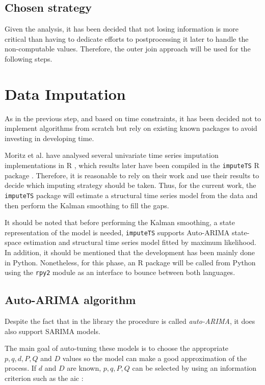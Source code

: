\subsection{Chosen strategy}

Given the analysis, it has been decided that not losing information is more critical than having to dedicate efforts to postprocessing it later to handle the non-computable values. Therefore, the outer join approach will be used for the following steps.

\section{Data Imputation}

As in the previous step, and based on time constraints, it has been decided not to implement algorithms from scratch but rely on existing known packages to avoid investing in developing time. 

Moritz et al. have analysed several univariate time series imputation implementations in R \cite{MoritzComparison}, which results later have been compiled in the \texttt{imputeTS} R package \cite{imputeTS}. Therefore, it is reasonable to rely on their work and use their results to decide which imputing strategy should be taken. 
Thus, for the current work, the \texttt{imputeTS} package will estimate a structural time series model from the data and then perform the Kalman smoothing to fill the gaps. 

It should be noted that before performing the Kalman smoothing, a state representation of the model is needed, \texttt{imputeTS} supports Auto-ARIMA state-space estimation and structural time series model fitted by maximum likelihood. In addition, it should be mentioned that the development has been mainly done in Python. Nonetheless, for this phase, an R package will be called from Python using the \texttt{rpy2} module as an interface to bounce between both languages.

\subsection{Auto-ARIMA algorithm}

Despite the fact that in the library the procedure is called \emph{auto-ARIMA}, it does also support SARIMA models.

The main goal of auto-tuning these models is to choose the appropriate $p, q, d, P, Q$ and $D$ values so the model can make a good approximation of the process. If $d$ and $D$ are known, $p, q, P, Q$ can be selected by using an information criterion such as the \ac{aic} \cite{Akaike1998}:

